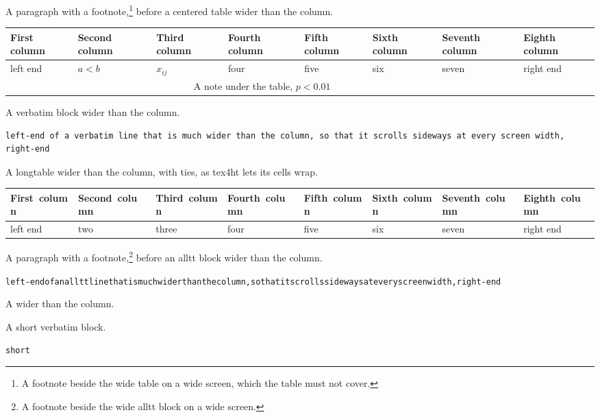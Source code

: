 \documentclass{article}
\begin{document}
A paragraph with a footnote,\footnote{A footnote beside the wide table on
a wide screen, which the table must not cover.} before a centered table
wider than the column.

\begin{center}
\begin{tabular}{|l|l|l|l|l|l|l|l|}
    \hline
    First column & Second column & Third column & Fourth column & Fifth column & Sixth column & Seventh column & Eighth column \\
    \hline
    left end & $a < b$ & $x_{ij}$ & four & five & six & seven & right end \\
    \hline
    \multicolumn{7}{c}{A note under the table, $p < 0.01$} \\
    \hline
\end{tabular}
\end{center}

A verbatim block wider than the column.

\begin{verbatim}
left-end of a verbatim line that is much wider than the column, so that it scrolls sideways at every screen width, right-end
\end{verbatim}

A longtable wider than the column, with ties, as tex4ht lets its cells wrap.

\begin{longtable}{|l|l|l|l|l|l|l|l|}
    \hline
    First~column & Second~column & Third~column & Fourth~column & Fifth~column & Sixth~column & Seventh~column & Eighth~column \\
    \hline
    left end & two & three & four & five & six & seven & right end \\
    \hline
\end{longtable}

A paragraph with a footnote,\footnote{A footnote beside the wide alltt
block on a wide screen.} before an alltt block wider than the column.

\begin{alltt}
left-end of an alltt line that is much wider than the column, so that it scrolls sideways at every screen width, right-end
\end{alltt}

A \verb|| wider than the column.



A short verbatim block.

\begin{verbatim}
short
\end{verbatim}
\end{document}
